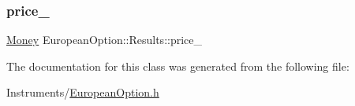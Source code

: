 \hypertarget{class_european_option_1_1_results_a517b87143fda866b135b21051dc4fd6c}{}\label{class_european_option_1_1_results_a517b87143fda866b135b21051dc4fd6c} 
\subsubsection{\texorpdfstring{price\+\_\+}{price\_}}
{\footnotesize\ttfamily \hyperlink{_name_def_8h_a5a9d48c16a694e9a2d9f1eca730dc8c5}{Money} European\+Option\+::\+Results\+::price\+\_\+}



The documentation for this class was generated from the following file\+:\begin{DoxyCompactItemize}
\item 
Instruments/\hyperlink{_european_option_8h}{European\+Option.\+h}\end{DoxyCompactItemize}
